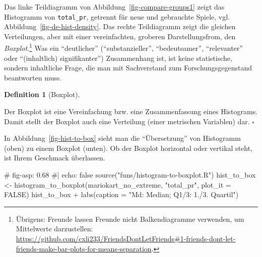 \documentclass[
  letterpaper,
]{scrbook}
\newenvironment{Shaded}{\begin{snugshade}}{\end{snugshade}}
\newcommand{\AttributeTok}[1]{\textcolor[rgb]{0.40,0.45,0.13}{#1}}
\newcommand{\CommentTok}[1]{\textcolor[rgb]{0.37,0.37,0.37}{#1}}
\newcommand{\ConstantTok}[1]{\textcolor[rgb]{0.56,0.35,0.01}{#1}}
\newcommand{\FunctionTok}[1]{\textcolor[rgb]{0.28,0.35,0.67}{#1}}
\newcommand{\NormalTok}[1]{\textcolor[rgb]{0.00,0.23,0.31}{#1}}
\newcommand{\OtherTok}[1]{\textcolor[rgb]{0.00,0.23,0.31}{#1}}
\newcommand{\SpecialCharTok}[1]{\textcolor[rgb]{0.37,0.37,0.37}{#1}}
\newcommand{\StringTok}[1]{\textcolor[rgb]{0.13,0.47,0.30}{#1}}
\theoremstyle{definition}
\theoremstyle{definition}
\theoremstyle{definition}
\newtheorem{definition}{Definition}[chapter]
\theoremstyle{remark}
\begin{document}
Das linke Teildiagramm von Abbildung~\ref{fig-compare-groups1} zeigt das
Histogramm von \texttt{total\_pr}, getrennt für neue und gebrauchte
Spiele, vgl. Abbildung~\ref{fig-de-hist-density}. Das rechte
Teildiagramm zeigt die gleichen Verteilungen, aber mit einer
vereinfachten, groberen Darstellungsfrom, den \emph{Boxplot}.\footnote{Übrigens:
  Freunde lassen Freunde nicht Balkendiagramme verwenden, um Mittelwerte
  darzustellen:
  \url{https://github.com/cxli233/FriendsDontLetFriends\#1-friends-dont-let-friends-make-bar-plots-for-means-separation}.}
Was ein \enquote{deutlicher} (\enquote{substanzieller},
\enquote{bedeutsamer}, \enquote{relevanter} oder \enquote{(inhaltlich)
signifikanter}) Zusammenhang ist, ist keine statistische, sondern
inhaltliche Frage, die man mit Sachverstand zum Forschungsgegenstand
beantworten muss.

\begin{definition}[Boxplot]\protect\hypertarget{def-boxplot}{}\label{def-boxplot}

Der Boxplot ist eine Vereinfachung bzw. eine Zusammenfassung eines
Histograms. Damit stellt der Boxplot auch eine Verteilung (einer
metrischen Variablen) dar. \(\square\)

\end{definition}

In Abbildung~\ref{fig-hist-to-box} sieht man die \enquote{Übersetzung}
von Histogramm (oben) zu einem Boxplot (unten). Ob der Boxplot
horizontal oder vertikal steht, ist Ihrem Geschmack überlassen.

\begin{Shaded}
\begin{Highlighting}[]
\CommentTok{\# fig{-}asp: 0.68}
\CommentTok{\#| echo: false}
\FunctionTok{source}\NormalTok{(}\StringTok{"funs/histogram{-}to{-}boxplot.R"}\NormalTok{)}
\NormalTok{hist\_to\_box }\OtherTok{\textless{}{-}} \FunctionTok{histogram\_to\_boxplot}\NormalTok{(mariokart\_no\_extreme, }\StringTok{"total\_pr"}\NormalTok{, }\AttributeTok{plot\_it =} \ConstantTok{FALSE}\NormalTok{)}
\NormalTok{hist\_to\_box }\SpecialCharTok{+}
  \FunctionTok{labs}\NormalTok{(}\AttributeTok{caption =} \StringTok{"Md: Median; Q1/3: 1./3. Quartil"}\NormalTok{)}
\end{Highlighting}
\end{Shaded}
\end{document}
